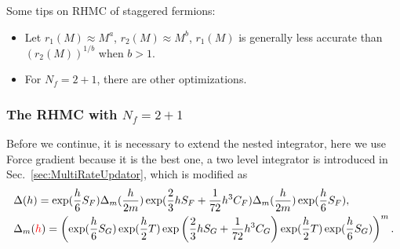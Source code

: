 Some tips on RHMC of staggered fermions:

\begin{itemize}
  \item Let $r_1(M)\approx M^{a}$, $r_2(M)\approx M^{b}$, $r_1(M)$ is generally less accurate than $(r_2(M))^{1/b}$ when $b>1$.
  \item For $N_f=2+1$, there are other optimizations.
\end{itemize}

\subsubsection{\label{sec:hmcofrhmcnf2p1}The RHMC with \texorpdfstring{$N_f=2+1$}{Nf=2+1}}

Before we continue, it is necessary to extend the nested integrator, here we use Force gradient because it is the best one, a two level integrator is introduced in Sec.~\ref{sec:MultiRateUpdator}, which is modified as
\begin{equation}
\begin{split}
&\Delta (h) =\exp (\frac{h}{6} S_F)\Delta _m (\frac{h}{2m})\exp(\frac{2}{3}h S_F+\frac{1}{72}h^3 C_F)\Delta _m(\frac{h}{2m}) \exp (\frac{h}{6} S_F),\\
&\Delta _m(\textcolor[rgb]{1,0,0}{h})=\left(\exp(\frac{h}{6 } S_G)\exp(\frac{h}{2}T)\exp\left(\frac{2}{3}h S_G+\frac{1}{72}h^3 C_G\right)\exp(\frac{h}{2}T)\exp(\frac{h}{6}S_G)\right)^m.\\
\end{split}
\end{equation}

